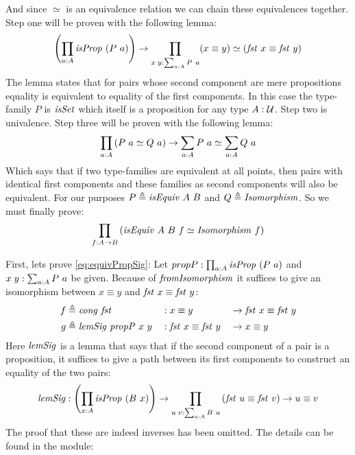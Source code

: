 And since $\simeq$ is an equivalence relation we can chain these equivalences
together. Step one will be proven with the following lemma:
%
\begin{align}
  \label{eq:equivPropSig}
\left(\prod_{a \tp A} \isProp\ (P\ a)\right) \to \prod_{x\;y \tp \sum_{a \tp A} P\ a} (x \equiv y) \simeq (\fst\ x \equiv \fst\ y)
\end{align}
%
The lemma states that for pairs whose second component are mere propositions
equality is equivalent to equality of the first components. In this case the
type-family $P$ is $\isSet$ which itself is a proposition for any type $A \mathrel{:}
\mathcal{U}$. Step two is univalence. Step three will be proven with the following
lemma:
%
\begin{align}
  \label{eq:equivSig}
\prod_{a \mathrel{:} A} \left( P\ a \simeq Q\ a \right) \to \sum_{a \mathrel{:} A} P\ a \simeq \sum_{a \mathrel{:} A} Q\ a
\end{align}
%
Which says that if two type-families are equivalent at all points, then pairs
with identical first components and these families as second components will
also be equivalent. For our purposes $P \defeq \isEquiv\ A\ B$ and $Q \defeq
\Isomorphism$. So we must finally prove:
%
\begin{align}
  \label{eq:equivIso}
\prod_{f \tp A \to B} \left( \isEquiv\ A\ B\ f \simeq \Isomorphism\ f \right)
\end{align}

First, lets prove \ref{eq:equivPropSig}: Let $propP \tp \prod_{a \tp A} \isProp\ (P\ a)$ and $x\;y \mathrel{:} \sum_{a \mathrel{:} A} P\ a$ be given. Because
of $\mathit{fromIsomorphism}$ it suffices to give an isomorphism between
$x \equiv y$ and $\fst\ x \equiv \fst\ y$:
%
\begin{equation*}
\begin{aligned}
  f & \defeq \congruence\ \fst
    && \tp x       \equiv y       && \to \fst\ x \equiv \fst\ y \\
  g & \defeq \var{lemSig}\ \var{propP}\ x\ y
    && \tp \fst\ x \equiv \fst\ y && \to x       \equiv y
\end{aligned}
\end{equation*}
%
Here $\mathit{lemSig}$ is
a lemma that says that if the second component of a pair is a proposition, it
suffices to give a path between its first components to construct an equality of
the two pairs:
%
\begin{align*}
\var{lemSig} \tp \left( \prod_{x \tp A} \isProp\ (B\ x) \right) \to
\prod_{u\; v \tp \sum_{a \tp A} B\ a}
  \left( \fst\ u \equiv \fst\ v \right) \to u \equiv v
\end{align*}
%
The proof that these are indeed inverses has been omitted. The details
can be found in the module:
\begin{center}
\end{center}

